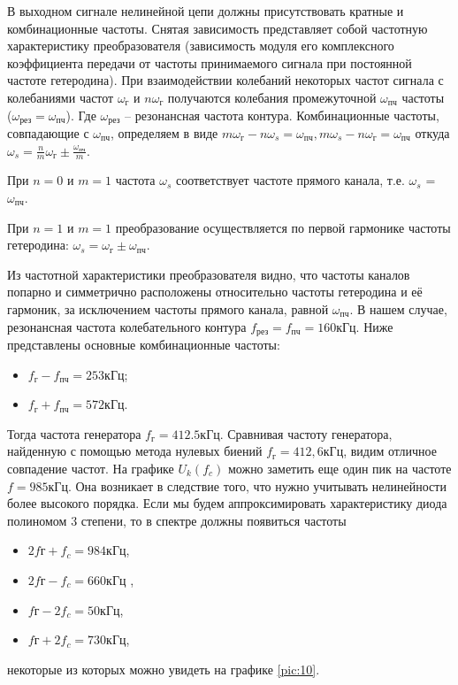 В выходном сигнале нелинейной цепи должны присутствовать кратные и комбинационные частоты. Снятая зависимость представляет собой частотную характеристику преобразователя (зависимость модуля его комплексного коэффициента передачи от частоты принимаемого сигнала при постоянной частоте гетеродина). При взаимодействии колебаний некоторых
частот сигнала с колебаниями частот 
$\omega_{\text{г}}$ и $n\omega_{\text{г}}$ 
получаются колебания промежуточной
$\omega_{\text{пч}}$ частоты 
($\omega_{\text{рез}} = \omega_{\text{пч}}$). 
Где $\omega_{\text{рез}}$ -- резонансная частота контура. Комбинационные частоты, совпадающие с 
$\omega_{\text{пч}}$, определяем в виде 
$m\omega_{\text{г}} - n\omega_s = \omega_{\text{пч}}, 
m\omega_s - n\omega_{\text{г}} = \omega_{\text{пч}}$ откуда 
$\omega_s =\frac{n}{m}\omega_{\text{г}}\pm\frac{\omega_{\text{пч}}}{m}$.

При $n = 0$ и $m = 1$ частота $\omega_s$ соответствует частоте прямого канала, т.е. $\omega_s$ = $\omega _{\text{пч}}$.

При $n = 1$ и $m = 1$ преобразование осуществляется по первой гармонике частоты гетеродина: $\omega_{s} = \omega_{\text{г}} \pm \omega_{\text{пч}}$.

Из частотной характеристики преобразователя видно, что частоты каналов попарно
и симметрично расположены относительно частоты гетеродина и её гармоник, за исключением частоты прямого канала, равной $\omega_{\text{пч}}$. 
В нашем случае, резонансная частота колебательного контура $f_{\text{рез}} = f_{\text{пч}} = 160 \text{кГц}$.
Ниже представлены основные комбинационные частоты:
\begin{itemize}
	
	\item $f_{\text{г}} - f_{\text{пч}} = 253 \text{кГц}$; 

	\item $f_{\text{г}} + f_{\text{пч}} =572 \text{кГц}$. 
\end{itemize}

Тогда частота генератора $f_{\text{г}}= 412.5 \text{кГц}$. Сравнивая частоту генератора, найденную с помощью метода нулевых биений $f_{\text{г}}=412,6 \text{кГц}$, видим отличное совпадение частот.
На графике $U_k(f_c)$ можно заметить еще один пик на частоте $f=985\text{кГц}$. Она возникает в следствие того, что нужно учитывать нелинейности более высокого порядка. Если мы будем аппроксимировать характеристику диода полиномом 3 степени, то в спектре должны появиться частоты 
\begin{itemize}
	
	\item $2f{\text{г}}+f_c=984 \text{кГц}$,
	\item $2f{\text{г}}-f_c=660 \text{кГц}$ , 
	\item $f{\text{г}}-2f_c=50 \text{кГц}$, 
	\item $f{\text{г}}+2f_c=730 \text{кГц}$, 

\end{itemize}
некоторые из которых можно увидеть на графике \ref{pic:10}.

